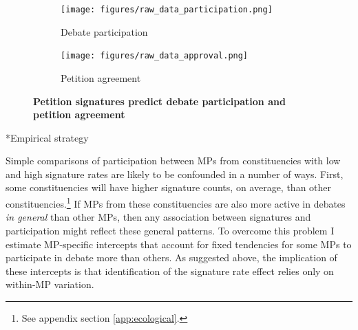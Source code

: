 \documentclass[12pt]{article}
\makeatletter
\renewcommand{\section}{\@startsection{section}{1}{0mm}{-\baselineskip}{0.20\baselineskip}{\centering\normalfont\normalsize\scshape}}
\makeatother
\begin{document}
\begin{figure}[t]
\centering

\begin{subfigure}[b]{.49\textwidth}
\caption{Debate participation}
\texttt{[image: figures/raw\_data\_participation.png]}

\end{subfigure}
\begin{subfigure}[b]{.49\textwidth}
\caption{Petition agreement}
\texttt{[image: figures/raw\_data\_approval.png]}

\end{subfigure}
\caption{\label{fig:raw_data_plots}\textbf{Petition signatures predict debate participation and petition agreement}}

\end{figure}

\section*{Empirical strategy}

Simple comparisons of participation between MPs from constituencies with low and high signature rates are likely to be confounded in a number of ways. First, some constituencies will have higher signature counts, on average, than other constituencies.\footnote{See appendix section \ref{app:ecological}.} If MPs from these constituencies are also more active in debates \emph{in general} than other MPs, then any association between signatures and participation might reflect these general patterns. To overcome this problem I estimate MP-specific intercepts that account for fixed tendencies for some MPs to participate in debate more than others. As suggested above, the implication of these intercepts is that identification of the signature rate effect relies only on within-MP variation.
\end{document}
